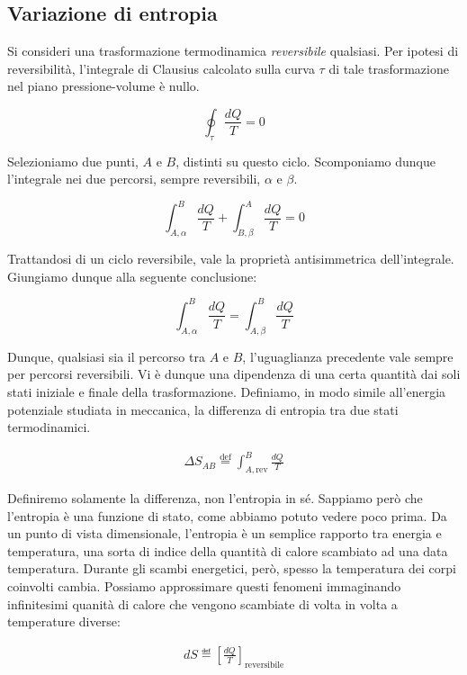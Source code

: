 \subsection{Variazione di entropia}
Si consideri una trasformazione termodinamica \textit{reversibile} qualsiasi.
Per ipotesi di reversibilità, l'integrale di Clausius calcolato sulla curva $\tau$
di tale trasformazione nel piano pressione-volume è nullo.

\[ \oint_\tau \frac{dQ}{T} = 0 \]

\noindent Selezioniamo due punti, $A$ e $B$, distinti su questo ciclo. Scomponiamo
dunque l'integrale nei due percorsi, sempre reversibili, $\alpha$ e $\beta$.

\[ \int_{A,\alpha}^{B} \frac{dQ}{T} + \int_{B,\beta}^{A} \frac{dQ}{T} = 0 \]

\noindent Trattandosi di un ciclo reversibile, vale la proprietà antisimmetrica
dell'integrale. Giungiamo dunque alla seguente conclusione:

\[ \int_{A,\alpha}^{B} \frac{dQ}{T} = \int_{A,\beta}^{B} \frac{dQ}{T} \]

\noindent Dunque, qualsiasi sia il percorso tra $A$ e $B$, l'uguaglianza
precedente vale sempre per percorsi reversibili. Vi è dunque una dipendenza
di una certa quantità dai soli stati iniziale e finale della trasformazione.
Definiamo, in modo simile all'energia potenziale studiata in meccanica,
la differenza di entropia tra due stati termodinamici.

\begin{align}
    \Delta S_{AB} \stackrel{\text{def}}{=} \int_{A,\text{rev}}^{B} \frac{dQ}{T}\label{variaz_entropia}
\end{align}

\noindent Definiremo solamente la differenza, non l'entropia in sé.
Sappiamo però che l'entropia è una funzione di stato, come abbiamo
potuto vedere poco prima. Da un punto di vista dimensionale, l'entropia
è un semplice rapporto tra energia e temperatura, una sorta di
indice della quantità di calore scambiato ad una data temperatura.
Durante gli scambi energetici, però, spesso la temperatura dei corpi
coinvolti cambia. Possiamo approssimare questi fenomeni immaginando
infinitesimi quanità di calore che vengono scambiate di volta in volta
a temperature diverse:

\begin{align}
    dS \eqdef \left[\frac{dQ}{T}\right]_\text{reversibile}\label{entropia_infinitesima}
\end{align}

